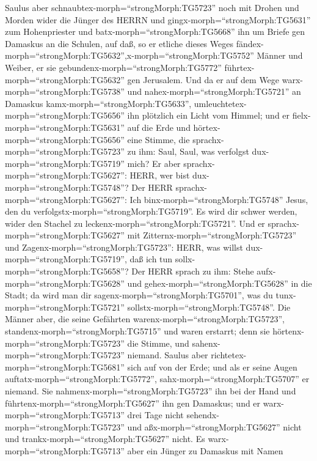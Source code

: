  Saulus aber schnaubtex-morph=``strongMorph:TG5723'' noch
mit Drohen und Morden wider die Jünger des HERRN und
gingx-morph=``strongMorph:TG5631'' zum Hohenpriester  und
batx-morph=``strongMorph:TG5668'' ihn um Briefe gen Damaskus an die
Schulen, auf daß, so er etliche dieses Weges
fändex-morph=``strongMorph:TG5632'',x-morph=``strongMorph:TG5752''
Männer und Weiber, er sie gebundenx-morph=``strongMorph:TG5772''
führtex-morph=``strongMorph:TG5632'' gen Jerusalem.  Und da
er auf dem Wege warx-morph=``strongMorph:TG5738'' und
nahex-morph=``strongMorph:TG5721'' an Damaskus
kamx-morph=``strongMorph:TG5633'',
umleuchtetex-morph=``strongMorph:TG5656'' ihn plötzlich ein Licht vom
Himmel;  und er fielx-morph=``strongMorph:TG5631'' auf die
Erde und hörtex-morph=``strongMorph:TG5656'' eine Stimme, die
sprachx-morph=``strongMorph:TG5723'' zu ihm: Saul, Saul, was verfolgst
dux-morph=``strongMorph:TG5719'' mich?  Er aber
sprachx-morph=``strongMorph:TG5627'': HERR, wer bist
dux-morph=``strongMorph:TG5748''? Der HERR
sprachx-morph=``strongMorph:TG5627'': Ich
binx-morph=``strongMorph:TG5748'' Jesus, den du
verfolgstx-morph=``strongMorph:TG5719''. Es wird dir schwer werden,
wider den Stachel zu leckenx-morph=``strongMorph:TG5721''. 
Und er sprachx-morph=``strongMorph:TG5627'' mit
Zitternx-morph=``strongMorph:TG5723'' und
Zagenx-morph=``strongMorph:TG5723'': HERR, was willst
dux-morph=``strongMorph:TG5719'', daß ich tun
sollx-morph=``strongMorph:TG5658''? Der HERR sprach zu ihm: Stehe
aufx-morph=``strongMorph:TG5628'' und gehex-morph=``strongMorph:TG5628''
in die Stadt; da wird man dir sagenx-morph=``strongMorph:TG5701'', was
du tunx-morph=``strongMorph:TG5721''
sollstx-morph=``strongMorph:TG5748''.  Die Männer aber, die
seine Gefährten warenx-morph=``strongMorph:TG5723'',
standenx-morph=``strongMorph:TG5715'' und waren erstarrt; denn sie
hörtenx-morph=``strongMorph:TG5723'' die Stimme, und
sahenx-morph=``strongMorph:TG5723'' niemand.  Saulus aber
richtetex-morph=``strongMorph:TG5681'' sich auf von der Erde; und als er
seine Augen auftatx-morph=``strongMorph:TG5772'',
sahx-morph=``strongMorph:TG5707'' er niemand. Sie
nahmenx-morph=``strongMorph:TG5723'' ihn bei der Hand und
führtenx-morph=``strongMorph:TG5627'' ihn gen Damaskus;  und
er warx-morph=``strongMorph:TG5713'' drei Tage nicht
sehendx-morph=``strongMorph:TG5723'' und
aßx-morph=``strongMorph:TG5627'' nicht und
trankx-morph=``strongMorph:TG5627'' nicht.  Es
warx-morph=``strongMorph:TG5713'' aber ein Jünger zu Damaskus mit Namen
